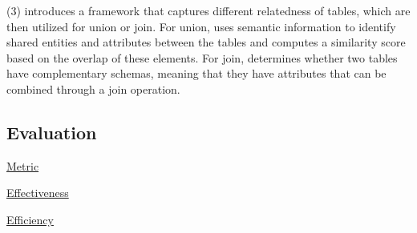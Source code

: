    \noindent  (3) \cc{\frt} introduces a framework that captures different relatedness of tables, which are then utilized for union or join. For union, \frt uses semantic information to identify shared entities and attributes between the tables and computes a similarity score based on the overlap of these elements.
    For join, \frt determines whether two tables have complementary schemas, meaning that they have attributes that can be combined through a join operation. 
  

\subsection{Evaluation}

\noindent\underline{Metric}

\noindent\underline{Effectiveness}

\noindent\underline{Efficiency}


